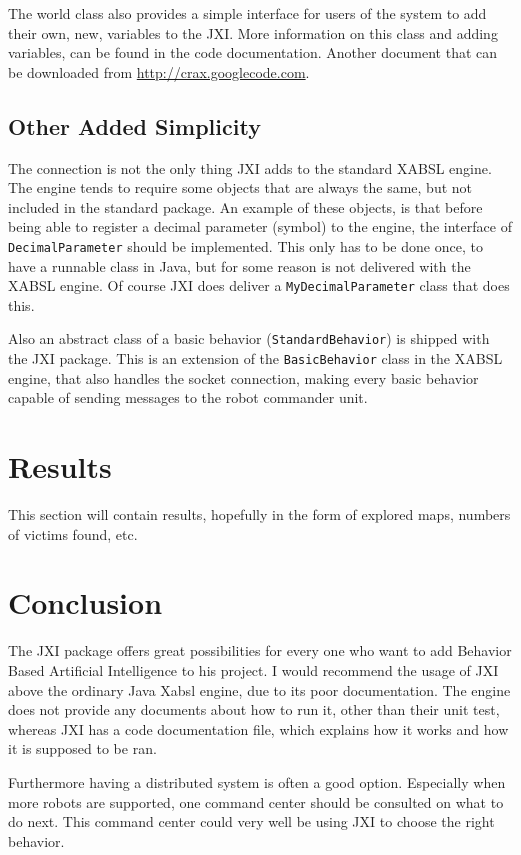 \documentclass[a4paper,10pt]{article}
\begin{document}
The world class also provides a simple interface for users of the system to add
their own, new, variables to the JXI. More information on this class and adding
variables, can be found in the code documentation. Another document that can be
downloaded from \url{http://crax.googlecode.com}.

\subsection{Other Added Simplicity}
The connection is not the only thing JXI adds to the standard XABSL engine. The
engine tends to require some objects that are always the same, but not included
in the standard package. An example of
these objects, is that before being able to register a decimal parameter
(symbol) to the engine, the interface of \texttt{DecimalParameter} should be
implemented. This only has to be done once, to have a runnable class in Java,
but for some reason is not delivered with the XABSL engine. Of course JXI does
deliver a \texttt{MyDecimalParameter} class that does this.

Also an abstract class of a basic behavior (\texttt{StandardBehavior}) is
shipped with the JXI package. This is an extension of the \texttt{BasicBehavior}
class in the XABSL engine, that also handles the socket connection, making every
basic behavior capable of sending messages to the robot commander unit.

\section{Results}
This section will contain results, hopefully in the form of explored maps, numbers of victims found, etc.

\section{Conclusion}
The JXI package offers great possibilities for every one who want to add
Behavior Based Artificial Intelligence to his project. I would recommend the
usage of JXI above the ordinary Java Xabsl engine, due to its poor
documentation. The engine does not provide any documents about how to run it,
other than their unit test, whereas JXI has a code documentation file, which
explains how it works and how it is supposed to be ran. 

Furthermore having a distributed system is often a good option. Especially when
more robots are supported, one command center should be consulted on what to do
next. This command center could very well be using JXI to choose the right
behavior.
\end{document}
